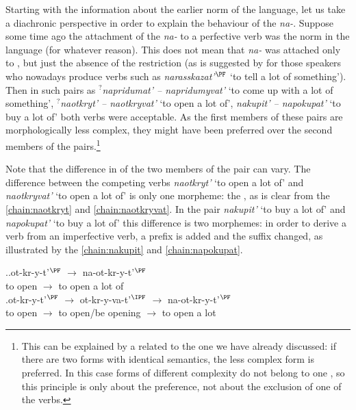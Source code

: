 Starting with the information about the earlier norm of the language, let us take a diachronic perspective in order to explain the behaviour of the  \textit{na-}. Suppose some time ago the attachment of the  \textit{na-} to a perfective verb was the norm in the language (for whatever reason). This does not mean that \textit{na-} was attached only to , but just the absence of the restriction (as is suggested by \citet{Tatevosov:13a} for those speakers who nowadays produce verbs such as \textit{narasskazat'}$^{\PF}$ `to tell a lot of something'). Then in such pairs as \textit{$^?$napridumat' -- napridumyvat'} `to come up with a lot of something', \textit{$^?$naotkryt' -- naotkryvat'} `to open a lot of', \textit{nakupit' -- napokupat'} `to buy a lot of' both verbs were acceptable. As the first members of these pairs are morphologically less complex, they might have been preferred over the second members of the pairs.\footnote{This can be explained by a  related to the one we have already discussed: if there are two forms with identical semantics, the less complex form is preferred. In this case forms of different complexity do not belong to one , so this principle is only about the preference, not about the exclusion of one of the verbs.} 

Note that the difference in  of the two members of the pair can vary. The  difference between the competing verbs \textit{naotkryt'} `to open a lot of' and \textit{naotkryvat'} `to open a lot of' is only one morpheme: the , as is clear from the  \ref{chain:naotkryt} and \ref{chain:naotkryvat}. In the pair  \textit{nakupit'} `to buy a lot of' and  \textit{napokupat'} `to buy a lot of' this difference is two morphemes: in order to derive a  verb from an imperfective verb, a prefix is added and the suffix changed, as illustrated by the  \ref{chain:nakupit} and \ref{chain:napokupat}.

\ex.\ag.\label{chain:naotkryt}ot-kr-y-t'$^{\PF}$ $\rightarrow$ na-ot-kr-y-t'$^{\PF}$\\
{to open} $\rightarrow$ {to open a lot of}\\
\bg.\label{chain:naotkryvat}ot-kr-y-t'$^{\PF}$ $\rightarrow$ ot-kr-y-va-t'$^{\IPF}$ $\rightarrow$ na-ot-kr-y-t'$^{\PF}$\\
{to open} $\rightarrow$ {to open/be opening} $\rightarrow$ {to open a lot}\\

